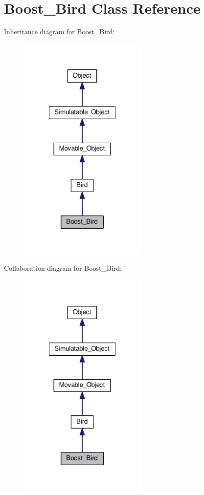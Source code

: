 \hypertarget{classBoost__Bird}{\section{Boost\+\_\+\+Bird Class Reference}
\label{classBoost__Bird}
}


Inheritance diagram for Boost\+\_\+\+Bird\+:\nopagebreak
\begin{figure}[H]
\begin{center}
\leavevmode
\includegraphics[width=180pt]{classBoost__Bird__inherit__graph}
\end{center}
\end{figure}


Collaboration diagram for Boost\+\_\+\+Bird\+:\nopagebreak
\begin{figure}[H]
\begin{center}
\leavevmode
\includegraphics[width=180pt]{classBoost__Bird__coll__graph}
\end{center}
\end{figure}
